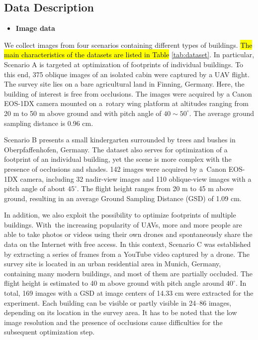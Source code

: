 \subsection{Data Description}
\begin{itemize}
\item \textbf{Image data}
\end{itemize}

We collect images from four scenarios containing different types of buildings. \hl{The main characteristics of the datasets are listed in Table }%
\ref{tab:dataset}. In particular, Scenario A is targeted at optimization of footprints of individual buildings. To this end, 375 oblique images of an isolated cabin were captured by a UAV flight. The survey site lies on a bare agricultural land in Finning, Germany. Here, the building of interest is free from occlusions. The images were acquired by a Canon EOS-1DX camera mounted on a~rotary wing platform at altitudes ranging from 20 m to 50 m above ground and with pitch angle of $40\sim50^\circ$. The average ground sampling distance is 0.96 cm.

Scenario B presents a small kindergarten surrounded by trees and bushes in Oberpfaffenhofen, Germany. The dataset also serves for optimization of a footprint of an individual building, yet the scene is more complex with the presence of occlusions and shades. 142 images were acquired by a~Canon EOS-1DX camera, including 32 nadir-view images and 110 oblique-view images with a pitch angle of about $45^\circ$. The flight height ranges from 20 m to 45 m above ground, resulting in an average Ground Sampling Distance (GSD) of 1.09 cm. 

In addition, we also exploit the possibility to optimize footprints of multiple buildings. With~the increasing popularity of UAVs, more and more people are able to take photos or videos using their own drones and spontaneously share the data on the Internet with free access. In this context, Scenario C was established by extracting a series of frames from a YouTube video captured by a drone. The survey site is located in an urban residential area in Munich, Germany, containing many modern buildings, and most of them are partially occluded. The flight height is estimated to 40 m above ground with pitch angle around $40^\circ$. In total, 169 images with a GSD at image centers of 14.33 cm were extracted for the experiment. Each building can be visible or partly visible in 24--86 images, depending on its location in the survey area. It has to be noted that the low image resolution and the presence of occlusions cause difficulties for the subsequent optimization step.

